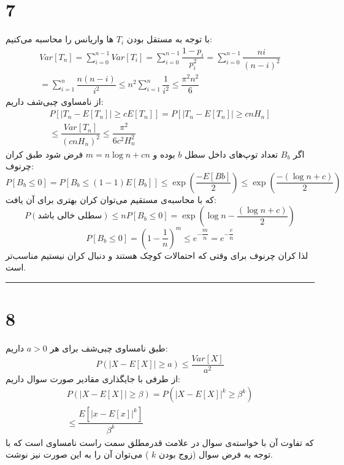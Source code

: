 \documentclass{article}
\begin{document}
\section*{7}
با توجه به مستقل بودن
$T_i$
ها واریانس را محاسبه می‌کنیم:
$$\begin{aligned}Var\left[ T_{n}\right] =\sum ^{n-1}_{i=0}Var\left[ T_{i}\right] =\sum ^{n-1}_{i=0}\dfrac{1-p_{i}}{p_{i}^{2}}=\sum ^{n-1}_{i=0}\dfrac{ni}{\left( n-i\right) ^{2}}\\ =\sum ^{n}_{i=1}\dfrac{n\left( n-i\right) }{i^{2}}\leq n^{2}\sum ^{n}_{i=1}\dfrac{1}{i^{2}}\leq \dfrac{\pi ^{2}n^{2}}{6}\end{aligned}$$
از نامساوی چبی‌شف داریم:
$$\begin{aligned}P\left[ \left| T_{n}-E\left[ T_{n}\right] \right| \geq cE\left[ T_{n}\right] \right] =P\left[ \left| T_{n}-E\left[ T_{n}\right] \right| \geq cnH_{n}\right] \\ \leq \dfrac{Var\left[ T_{n}\right] }{\left( cnH_{n}\right) ^{2}}\leq \dfrac{\pi ^{2}}{6c^{2}H_{n}^{2}}\end{aligned}$$
اگر 
$B_b$
تعداد توپ‌های داخل سطل
$b$
بوده و 
$m=n\log n+cn$
فرض شود طبق کران چرنوف:
$$P\left[ B_{b}\leq 0\right] =P\left[ B_{b}\leq \left( 1-1\right) E\left[ B_{b}\right] \right] \leq \exp \left( \dfrac{-E\left[ Bb\right] }{2}\right) \leq \exp \left( \dfrac{-\left( \log n+c\right) }{2}\right)$$
که با محاسبه‌ی مستقیم می‌توان کران بهتری برای آن یافت:
$$P\left( \text{سطلی خالی باشد}\right) \leq nP\left[ B_{b}\leq 0\right] =\exp \left( \log n-\dfrac{\left( \log n+c\right) }{2}\right)$$
$$P\left[ B_{b}\leq 0\right] =\left( 1-\dfrac{1}{n}\right) ^{m}\leq e^{-\dfrac{m}{n}}=e^{-\dfrac{c}{n}}
$$
لذا کران چرنوف برای وقتی که احتمالات کوچک هستند و دنبال کران
نیستیم مناسب‌تر است.

\rule{\linewidth}{1pt}
\section*{8}
طبق نامساوی چبی‌شف برای هر
$a > 0$
داریم:
$$P( \left| X-E\left[ X\right] \right| \geq a) \leq \dfrac{Var\left[ X\right] }{a^{2}}
$$
از طرفی با جایگذاری مقادیر صورت سوال داریم:
$$\begin{aligned}P\left( \left| X-E\left[ X\right] \right| \geq \beta \right) =P\left( \left| X-E\left[ X\right] \right| ^{k}\geq \beta ^{k}\right) \\ \leq \dfrac{E\left[ \left| x-E\left[ x\right] \right| ^{k}\right] }{\beta ^{k}}\end{aligned}$$
که تفاوت آن با خواسته‌ی سوال در علامت قدرمطلق سمت راست نامساوی است که با توجه به فرض سوال (زوج بودن
$k$
) می‌توان آن را به این صورت نیز نوشت.
\end{document}
